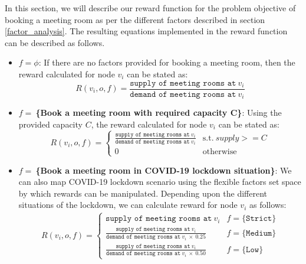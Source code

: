 In this section, we will describe our reward function for the problem objective of booking a meeting room as per the different factors described in section \ref{factor_analysis}. The resulting equations implemented in the reward function can be described as follows.

\begin{itemize}
    \item \textbf{$f=\phi$}: If there are no factors provided for booking a meeting room, then the reward calculated for node $v_i$ can be stated as:
    \begin{equation}
        R(v_i,o,f) = \frac{\texttt{supply of meeting rooms at}\:v_i}{\texttt{demand of meeting rooms at}\:v_i}
    \end{equation}
    
    \item \textbf{$f=\:$\{Book a meeting room with required capacity C\}}: Using the provided capacity $C$, the reward calculated for node $v_i$ can be stated as:
    \begin{equation}
        R(v_i,o,f) = \begin{cases}
          \frac{\texttt{supply of meeting rooms at}\:v_i}{\texttt{demand of meeting rooms at}\:v_i} & \text{s.t.}\:supply >= C\\    
          0 & \text{otherwise}
        \end{cases}
    \end{equation}
    
    \item \textbf{$f=\:$\{Book a meeting room in COVID-19 lockdown situation\}}: We can also map COVID-19 lockdown scenario using the flexible factors set space by which rewards can be manipulated. Depending upon the different situations of the lockdown, we can calculate reward for node $v_i$ as follows:
    \begin{gather}
        R(v_i,o,f) =
        \begin{cases}\texttt{supply of meeting rooms at}\:v_i & f=\texttt{\{Strict\}} \\
         \frac{\texttt{supply of meeting rooms at}\:v_i}{\texttt{demand of meeting rooms at}\:v_i\:\times\:0.25} & f=\texttt{\{Medium\}}\\
         \frac{\texttt{supply of meeting rooms at}\:v_i}{\texttt{demand of meeting rooms at}\:v_i\:\times\:0.50} & f=\texttt{\{Low\}}
        \end{cases}
    \end{gather}
    

\end{itemize}
